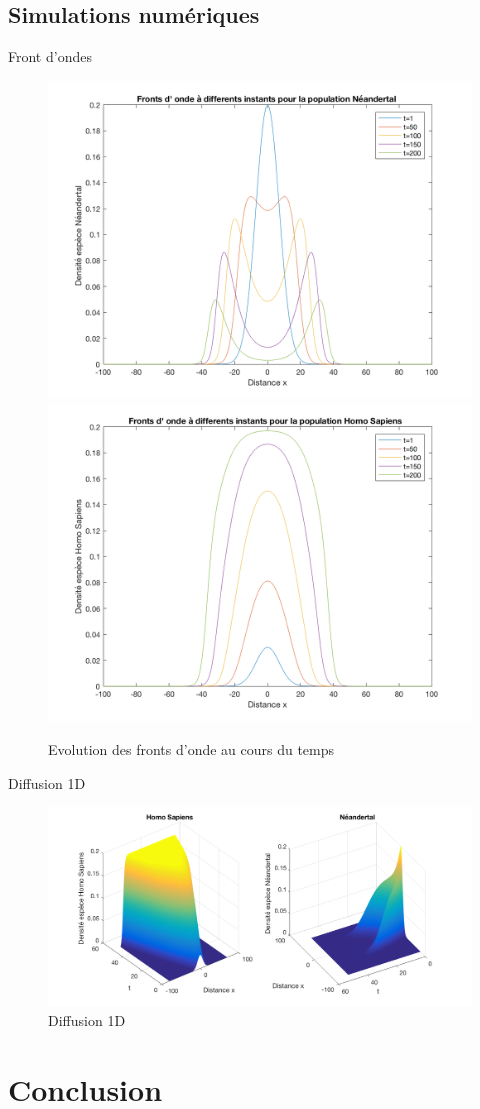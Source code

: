 \documentclass[10pt]{beamer}
\begin{document}
\subsection{Simulations numériques}
\begin{frame}{Front d'ondes}{}
\begin{figure}[H]
\centering
\includegraphics[width=0.48\linewidth]{Comp/neand.png}
\includegraphics[width=0.48\linewidth]{Comp/homo.png}
\caption{Evolution des fronts d'onde au cours du temps}
\end{figure}
\end{frame}

\begin{frame}{Diffusion 1D}{}
\begin{figure}[H]
\centering
\includegraphics[scale=0.2]{Comp/CompDiff2.png}
\caption{Diffusion 1D}
\end{figure}
\end{frame}

\section{Conclusion}
\end{document}
